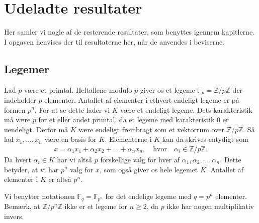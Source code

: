 \appendix

\chapter{Udeladte resultater}
Her samler vi nogle af de resterende resultater, som benyttes igennem kapitlerne. I opgaven henvises der til resultaterne her, når de anvendes i beviserne. 

\section{Legemer}
\label{appendiks_legemer}
Lad $p$ være et primtal. Heltallene modulo $p$ giver os et legeme $\mathbb{F}_p = \mathbb{Z}/p\mathbb{Z}$ der indeholder $p$ elementer. Antallet af elementer i ethvert endeligt legeme er på formen $p^n$. For at se dette lader vi $K$ være et endeligt legeme. Dets karakteristik må være $p$ for et eller andet primtal, da et legeme med karakteristik $0$ er uendeligt. Derfor må $K$ være endeligt frembragt som et vektorrum over $\mathbb{Z}/p\mathbb{Z}$. Så lad $x_1, \ldots, x_n$ være en basis for $K$. Elementerne i $K$ kan da skrives entydigt som
\begin{align*}
	x= \alpha_1 x_1 + \alpha_2 x_2 + \ldots + \alpha_n x_n, \quad \text{hvor} \quad \alpha_i \in \mathbb{Z}/p\mathbb{Z}.
\end{align*}
Da hvert $\alpha_i \in K$ har vi altså $p$ forskellige valg for hver af $\alpha_1, \alpha_2, \ldots, \alpha_n$. Dette betyder, at vi har $p^n$ valg for $x$, som også giver os hele legemet $K$. Antallet af elementer i $K$ er altså $p^n$. 

Vi benytter notationen $\mathbb{F}_q = \mathbb{F}_{p^n}$ for det endelige legeme med $q=p^n$ elementer. Bemærk, at $\mathbb{Z}/p^n \mathbb{Z}$ ikke er et legeme for $n \geq 2$, da $p$ ikke har nogen multiplikativ invers.

